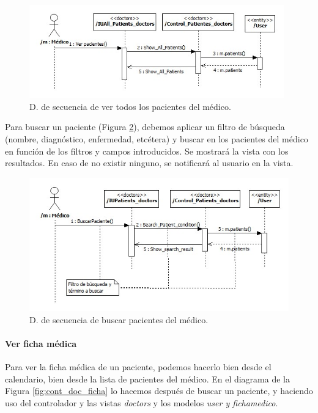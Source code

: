 					\begin{figure}[H]
					  \centering
					    \includegraphics[width=11cm]{img/jpg/secuencia/7_doc_patients_all.jpg}
					  \caption{D. de secuencia de ver todos los pacientes del médico.}
					  \label{fig:cont_doc_patients}
					\end{figure} 
					
					Para buscar un paciente (Figura \ref{fig:cont_doc_patient_search}), debemos aplicar un filtro de búsqueda (nombre, diagnóstico, enfermedad, etcétera) y buscar en los pacientes del médico en función de los filtros y campos introducidos. Se mostrará la vista con los resultados. En caso de no existir ninguno, se notificará al usuario en la vista.
					
					\begin{figure}[H]
					  \centering
					    \includegraphics[width=13cm]{img/jpg/secuencia/8_doc_patients_search.jpg}
					  \caption{D. de secuencia de buscar pacientes del médico.}
					  \label{fig:cont_doc_patient_search}
					\end{figure}
				
				
				\paragraph{Ver ficha médica} %
				\label{subp:cont_ver_ficha_medica}
					
						Para ver la ficha médica de un paciente, podemos hacerlo bien desde el calendario, bien desde la lista de pacientes del médico. En el diagrama de la Figura \ref{fig:cont_doc_ficha} lo hacemos después de buscar un paciente, y haciendo uso del controlador y las vistas \textit{doctors} y los modelos \textit{user y fichamedico}.
						
